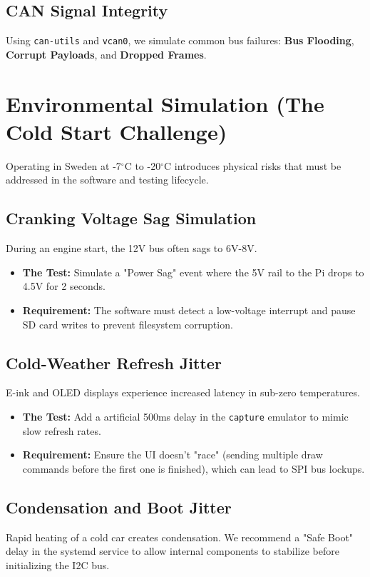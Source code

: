 \documentclass[11pt, a4paper]{article}
\begin{document}
\subsection{CAN Signal Integrity}
Using \texttt{can-utils} and \texttt{vcan0}, we simulate common bus failures: \textbf{Bus Flooding}, \textbf{Corrupt Payloads}, and \textbf{Dropped Frames}.

\section{Environmental Simulation (The Cold Start Challenge)}
Operating in Sweden at -7$^\circ$C to -20$^\circ$C introduces physical risks that must be addressed in the software and testing lifecycle.

\subsection{Cranking Voltage Sag Simulation}
During an engine start, the 12V bus often sags to 6V-8V.
\begin{itemize}
    \item \textbf{The Test:} Simulate a "Power Sag" event where the 5V rail to the Pi drops to 4.5V for 2 seconds.
    \item \textbf{Requirement:} The software must detect a low-voltage interrupt and pause SD card writes to prevent filesystem corruption.
\end{itemize}

\subsection{Cold-Weather Refresh Jitter}
E-ink and OLED displays experience increased latency in sub-zero temperatures.
\begin{itemize}
    \item \textbf{The Test:} Add a artificial 500ms delay in the \texttt{capture} emulator to mimic slow refresh rates.
    \item \textbf{Requirement:} Ensure the UI doesn't "race" (sending multiple draw commands before the first one is finished), which can lead to SPI bus lockups.
\end{itemize}

\subsection{Condensation and Boot Jitter}
Rapid heating of a cold car creates condensation. We recommend a "Safe Boot" delay in the systemd service to allow internal components to stabilize before initializing the I2C bus.
\end{document}
